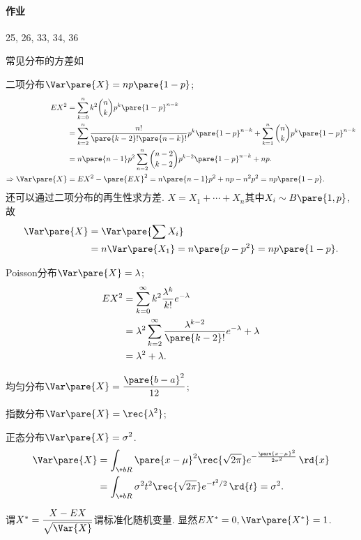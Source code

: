 \documentclass[../Statistics.tex]{subfiles}
\begin{document}
\paragraph{作业} %
\label{par:作业}

25, 26, 33, 34, 36


\par
常见分布的方差如
\begin{cenum}
    \item 二项分布$\displaystyle \Var\pare{X} = np\pare{1-p}$;
    \begin{align*}
        EX^2 &= \sum_{k=0}^n k^2 \binom{n}{k} p^k \pare{1-p}^{n-k} \\
        &= \sum_{k=2}^n \frac{n!}{\pare{k-2}!\pare{n-k}!} p^k \pare{1-p}^{n-k} + \sum_{k=1}^n \binom{n}{k}p^k\pare{1-p}^{n-k} \\
        &= n\pare{n-1}p^2\sum_{n=2}^n \binom{n-2}{k-2} p^{k-2}\pare{1-p}^{n-k} + np. \\
        \Rightarrow \Var\pare{X} &= EX^2 - \pare{EX}^2 = n\pare{n-1}p^2 + np - n^2p^2 = np\pare{1-p}.
    \end{align*}
    还可以通过二项分布的再生性求方差. $X = X_1 + \cdots + X_n$其中$X_i\sim B\pare{1,p}$, 故
    \begin{align*}
        \Var\pare{X} &= \Var\pare{\sum X_i} \\
        &= n\Var\pare{X_1} = n\pare{p-p^2} = np\pare{1-p}.
    \end{align*}
    \item Poisson分布$\displaystyle \Var\pare{X} = \lambda$;
    \begin{align*}
        EX^2 &= \sum_{k=0}^\infty k^2 \frac{\lambda^k}{k!}e^{-\lambda} \\
        &= \lambda^2 \sum_{k=2}^\infty \frac{\lambda^{k-2}}{\pare{k-2}!}e^{-\lambda} + \lambda \\
        &= \lambda^2 + \lambda.
    \end{align*}
    \item 均匀分布$\displaystyle \Var\pare{X} = \frac{\pare{b-a}^2}{12}$;
    \item 指数分布$\displaystyle \Var\pare{X} = \displaystyle \rec{\lambda^2}$;
    \item 正态分布$\displaystyle \Var\pare{X} = \sigma^2$.
    \begin{align*}
        \Var\pare{X} &= \int_{\+bR} \pare{x-\mu}^2 \rec{\sqrt{2\pi}} e^{-\frac{\pare{x-\mu}^2}{2\sigma^2}}\,\rd{x} \\
        &= \int_{\+bR} \sigma^2 t^2 \rec{\sqrt{2\pi}} e^{-t^2/2}\,\rd{t} = \sigma^2.
    \end{align*}
\end{cenum}
谓$X^* = \displaystyle \frac{X-EX}{\sqrt{\Var{X}}}$谓标准化随机变量. 显然$EX^* = 0, \Var\pare{X^*} = 1$.
\end{document}
